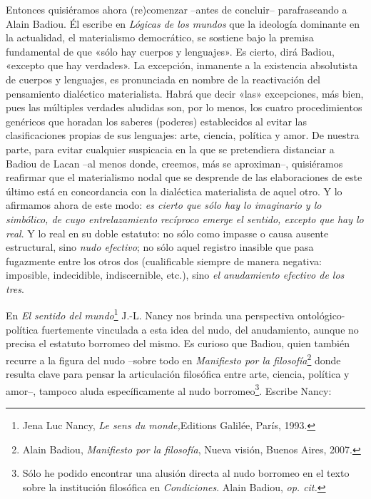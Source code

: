 Entonces quisiéramos ahora (re)comenzar --antes de concluir-- parafraseando a Alain Badiou. Él escribe en \emph{Lógicas de los mundos} que la ideología dominante en la actualidad, el materialismo democrático, se sostiene bajo la premisa fundamental de que «sólo hay cuerpos y lenguajes». Es cierto, dirá Badiou, «excepto que hay verdades». La excepción, inmanente a la existencia absolutista de cuerpos y lenguajes, es pronunciada en nombre de la reactivación del pensamiento dialéctico materialista. Habrá que decir «las» excepciones, más bien, pues las múltiples verdades aludidas son, por lo menos, los cuatro procedimientos genéricos que horadan los saberes (poderes) establecidos al evitar las clasificaciones propias de sus lenguajes: arte, ciencia, política y amor. De nuestra parte, para evitar cualquier suspicacia en la que se pretendiera distanciar a Badiou de Lacan --al menos donde, creemos, más se aproximan--, quisiéramos reafirmar que el materialismo nodal que se desprende de las elaboraciones de este último está en concordancia con la dialéctica materialista de aquel otro. Y lo afirmamos ahora de este modo: \emph{es cierto que sólo hay lo imaginario y lo simbólico, de cuyo entrelazamiento recíproco emerge el sentido, excepto que hay lo real}. Y lo real en su doble estatuto: no sólo como impasse o causa ausente estructural, sino \emph{nudo efectivo}; no sólo aquel registro inasible que pasa fugazmente entre los otros dos (cualificable siempre de manera negativa: imposible, indecidible, indiscernible, etc.), sino \emph{el anudamiento efectivo de los tres}.

En \emph{El sentido del mundo}\footnote{Jena Luc Nancy, \emph{Le sens du monde,}Editions Galilée, París, 1993.} J.-L. Nancy nos brinda una perspectiva ontológico-política fuertemente vinculada a esta idea del nudo, del anudamiento, aunque no precisa el estatuto borromeo del mismo. Es curioso que Badiou, quien también recurre a la figura del nudo --sobre todo en \emph{Manifiesto por la filosofía}\footnote{Alain Badiou, \emph{Manifiesto por la filosofía}, Nueva visión, Buenos Aires, 2007.} donde resulta clave para pensar la articulación filosófica entre arte, ciencia, política y amor--, tampoco aluda específicamente al nudo borromeo\footnote{Sólo he podido encontrar una alusión directa al nudo borromeo en el texto sobre la institución filosófica en \emph{Condiciones}. Alain Badiou, \emph{op. cit.}}. Escribe Nancy:

